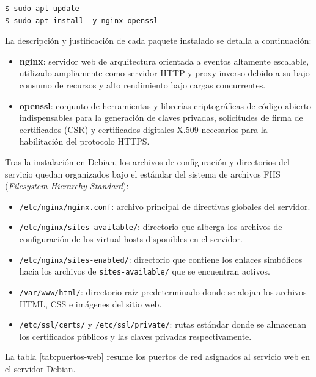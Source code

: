 \begin{lstlisting}[style=terminal]
$ sudo apt update
$ sudo apt install -y nginx openssl
\end{lstlisting}

La descripción y justificación de cada paquete instalado se detalla a
continuación:

\begin{itemize}
  \item \textbf{nginx}: servidor web de arquitectura orientada a eventos
        altamente escalable, utilizado ampliamente como servidor HTTP y proxy
        inverso debido a su bajo consumo de recursos y alto rendimiento bajo
        cargas concurrentes.
  \item \textbf{openssl}: conjunto de herramientas y librerías criptográficas de
        código abierto indispensables para la generación de claves privadas,
        solicitudes de firma de certificados (CSR) y certificados digitales
        X.509 necesarios para la habilitación del protocolo HTTPS.
\end{itemize}

Tras la instalación en Debian, los archivos de configuración y directorios del
servicio quedan organizados bajo el estándar del sistema de archivos FHS
(\textit{Filesystem Hierarchy Standard}):

\begin{itemize}
  \item \texttt{/etc/nginx/nginx.conf}: archivo principal de directivas globales
        del servidor.
  \item \texttt{/etc/nginx/sites-available/}: directorio que alberga los archivos
        de configuración de los virtual hosts disponibles en el servidor.
  \item \texttt{/etc/nginx/sites-enabled/}: directorio que contiene los enlaces
        simbólicos hacia los archivos de \texttt{sites-available/} que se
        encuentran activos.
  \item \texttt{/var/www/html/}: directorio raíz predeterminado donde se alojan
        los archivos HTML, CSS e imágenes del sitio web.
  \item \texttt{/etc/ssl/certs/} y \texttt{/etc/ssl/private/}: rutas estándar
        donde se almacenan los certificados públicos y las claves privadas
        respectivamente.
\end{itemize}

La tabla \ref{tab:puertos-web} resume los puertos de red asignados al servicio
web en el servidor Debian.

